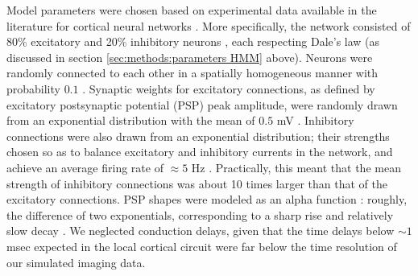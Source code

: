 \documentclass[aoas,preprint]{imsart}
\begin{document}
Model parameters were chosen based on experimental data available in
the literature for cortical neural networks
\cite{Braitenberg1998,Urquijo2000,Lefort2009,Sayer1990}. More
specifically, the network consisted of 80\% excitatory and 20\%
inhibitory neurons \cite{Braitenberg1998,Urquijo2000}, each respecting
Dale's law (as discussed in section \ref{sec:methods:parameters HMM}
above). Neurons were randomly connected to each other in a spatially
homogeneous manner with probability $0.1$
\cite{Braitenberg1998,Lefort2009}. Synaptic weights for excitatory
connections, as defined by excitatory postsynaptic potential (PSP)
peak amplitude, were randomly drawn from an exponential distribution
with the mean of $0.5$ mV \cite{Lefort2009,Sayer1990}. Inhibitory
connections were also drawn from an exponential distribution; their
strengths chosen so as to balance excitatory and inhibitory currents
in the network, and achieve an average firing rate of $\approx 5 $ Hz
\cite{Abeles91}. Practically, this meant that the mean strength of
inhibitory connections was about 10 times larger than that of the
excitatory connections. PSP shapes were modeled as an alpha function
\cite{Koch99}: roughly, the difference of two exponentials,
corresponding to a sharp rise and relatively slow decay
\cite{Sayer1990}. We neglected conduction delays, given that the time
delays below $\sim 1$ msec expected in the local cortical circuit were
far below the time resolution of our simulated imaging data.
\end{document}

